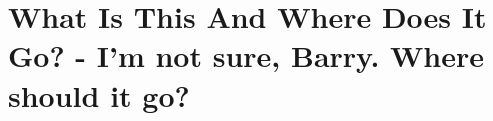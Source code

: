\chapter{What Is This And Where Does It Go? - I'm not sure, Barry. Where should it go?}

%

%

%

%

%  
